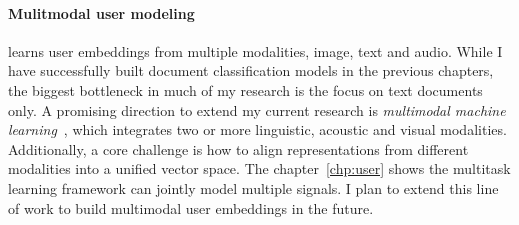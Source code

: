 \paragraph{Mulitmodal user modeling}
learns user embeddings from multiple modalities, image, text and audio. 
While I have successfully built document classification models in the previous chapters, the biggest bottleneck in much of my research is the focus on text documents only.
A promising direction to extend my current research is \textit{multimodal machine learning}~\cite{baltrusaitis2019multimodal}, which integrates two or more linguistic, acoustic and visual modalities.
Additionally, a core challenge is how to align representations from different modalities into a unified vector space. 
The chapter~\ref{chp:user} shows the multitask learning framework can jointly model multiple signals. 
I plan to extend this line of work to build multimodal user embeddings in the future.
